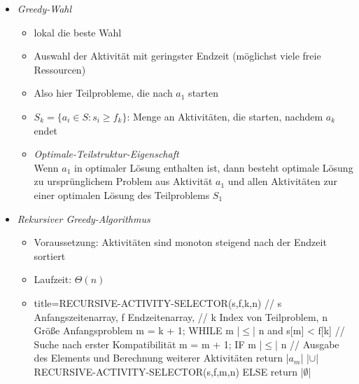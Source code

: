 \documentclass[
    12pt,
    a4paper,
    ngerman,
    color=3b,%
    marginpar=false,
    colorback=false,
    leqno,
]{tudaexercise}
\begin{document}
\begin{itemize}
\begin{itemize}
                \item \textit{Greedy-Wahl}
                    \begin{itemize}
                        \item lokal die beste Wahl
                        \item Auswahl der Aktivität mit geringster Endzeit (möglichst viele freie Ressourcen)
                        \item Also hier Teilprobleme, die nach $a_1$ starten
                        \item $S_k = \{a_i \in S: s_i \geq f_k\}$: Menge an Aktivitäten, die starten, nachdem $a_k$ endet
                        \item \textit{Optimale-Teilstruktur-Eigenschaft} \\
                                Wenn $a_1$ in optimaler Lösung enthalten ist, dann besteht optimale Lösung zu ursprünglichem
                                Problem aus Aktivität $a_1$ und allen Aktivitäten zur einer optimalen Lösung des 
                                Teilproblems $S_1$
                    \end{itemize}
\clearpage
                \item \textit{Rekursiver Greedy-Algorithmus}
                    \begin{itemize}
                        \item Voraussetzung: Aktivitäten sind monoton steigend nach der Endzeit sortiert
                        \item Laufzeit: $\Theta(n)$
                        \item[]
                            \begin{ccode}[autogobble,escapeinside=||]{title={RECURSIVE-ACTIVITY-SELECTOR(s,f,k,n)}}
                            // s Anfangszeitenarray, f Endzeitenarray, 
                            // k Index von Teilproblem, n Größe Anfangsproblem
                            m = k + 1;
                            WHILE m |$\leq$| n and s[m] < f[k]  // Suche nach erster Kompatibilität
                                m = m + 1;
                            IF m |$\leq$| n
                                // Ausgabe des Elements und Berechnung weiterer Aktivitäten
                                return {|$a_m$|} |$\cup$| RECURSIVE-ACTIVITY-SELECTOR(s,f,m,n)
                            ELSE
                                return |$\emptyset$|
                            \end{ccode}
                    \end{itemize}
                

\end{itemize}
\end{itemize}
\end{document}
